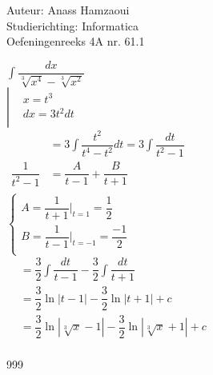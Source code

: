 \documentclass[a4paper]{article}
\begin{document}
\noindent \large Auteur: Anass Hamzaoui \\
\noindent \large Studierichting: Informatica \\
\noindent \large Oefeningenreeks 4A nr. 61.1 \\
\medskip
\normalsize

$\displaystyle\int \dfrac{dx}{\sqrt[3]{x^4} - \sqrt[3]{x^2}}$ \\

$\left|\begin{array}{ll}
    & x = t^3 \\
    
    & dx = 3t^2 dt \\
    
\end{array}\right.$ \\

$\begin{array}{ll}
&= 3\displaystyle\int \dfrac{t^2}{t^4 - t^2} dt = 3\displaystyle\int \dfrac{dt}{t^2 - 1} \\

\dfrac{1}{t^2-1} &= \dfrac{A}{t-1} + \dfrac{B}{t+1} \\

\end{array}$ \\

$\left\{\begin{array}{l}

    A = \dfrac{1}{t+1}\bigg|_{t=1} = \dfrac{1}{2} \\
    
    B = \dfrac{1}{t-1}\bigg|_{t=-1} = \dfrac{-1}{2} \\
    
\end{array}\right.$ \\

$\begin{array}{ll}
&= \dfrac{3}{2}\displaystyle\int \dfrac{dt}{t-1} - \dfrac{3}{2}\displaystyle\int \dfrac{dt}{t+1}\\

&= \dfrac{3}{2}\ln|t-1| - \dfrac{3}{2}\ln|t+1| + c \\

&= \dfrac{3}{2}\ln|\sqrt[3]{x}-1| - \dfrac{3}{2}\ln|\sqrt[3]{x}+1| + c \\

\end{array}$

\begin{thebibliography}{999}
\end{thebibliography}
\end{document}
